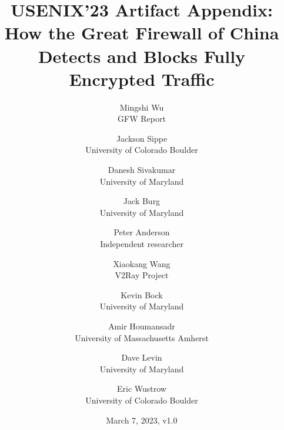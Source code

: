 \usepackage{tikz}
\usepackage{amsmath}
\usepackage{url}
\usepackage{hyperref}
\usepackage{paralist}
\usepackage{titling}
\setlength{\droptitle}{-1.2cm}

\ifpdf
{}
\pdftrailerid{}
\fi

%
%
%
%




\date{March 7, 2023, v1.0}

\title{USENIX'23 Artifact Appendix: How the Great Firewall of China \\Detects and Blocks Fully Encrypted Traffic}

\author{
    {\rm Mingshi Wu}\\
    GFW Report
    \and
    {\rm Jackson Sippe}\\
    University of Colorado Boulder
    \and
    {\rm Danesh Sivakumar}\\
    University of Maryland
    \and
    {\rm Jack Burg}\\
    University of Maryland
    \and
    {\rm Peter Anderson}\\
    Independent researcher
    \and
    {\rm Xiaokang Wang}\\
    V2Ray Project
    \and
    {\rm Kevin Bock}\\
    University of Maryland
    \and
    {\rm Amir Houmansadr}\\
    University of Massachusetts Amherst
    \and
    {\rm Dave Levin}\\
    University of Maryland
    \and
    {\rm Eric Wustrow}\\
    University of Colorado Boulder
}

\maketitle





